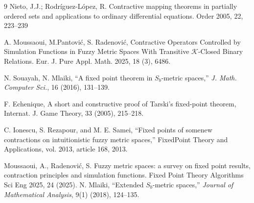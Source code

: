 \documentclass[sn-mathphys-num]{sn-jnl}%
\theoremstyle{thmstyleone}%
\theoremstyle{thmstyletwo}%
\theoremstyle{thmstylethree}%
\numberwithin{equation}{section}
\begin{document}
\begin{thebibliography}{9}
Nieto, J.J.; Rodríguez-López, R. Contractive mapping theorems in partially ordered sets and applications to ordinary differential equations. Order 2005, 22, 223–239


 A. Moussaoui, M.Pantović, S. Radenović, Contractive Operators Controlled by Simulation Functions in Fuzzy Metric Spaces With Transitive $\mathcal{K}$-Closed Binary Relations. Eur. J. Pure Appl. Math. 2025, 18 (3), 6486.

N. Souayah, N. Mlaiki,
``A fixed point theorem in $S_{b}$-metric spaces,''
\textit{J. Math. Computer Sci.}, 16 (2016), 131--139.

F. Echenique, A short and constructive proof of Tarski’s fixed-point theorem, Internat. J. Game Theory, 33 (2005),
215–218.

C. Ionescu, S. Rezapour, and M. E. Samei, “Fixed points of somenew contractions on intuitionistic fuzzy metric spaces,” FixedPoint Theory and Applications, vol. 2013, article 168, 2013.

Moussaoui, A., Radenović, S. Fuzzy metric spaces: a survey on fixed point results, contraction principles and simulation functions. Fixed Point Theory Algorithms Sci Eng 2025, 24 (2025).
N. Mlaiki,
``Extended $S_{b}$-metric spaces,''
\textit{Journal of Mathematical Analysis}, 9(1) (2018), 124--135.



\end{thebibliography}
\end{document}
